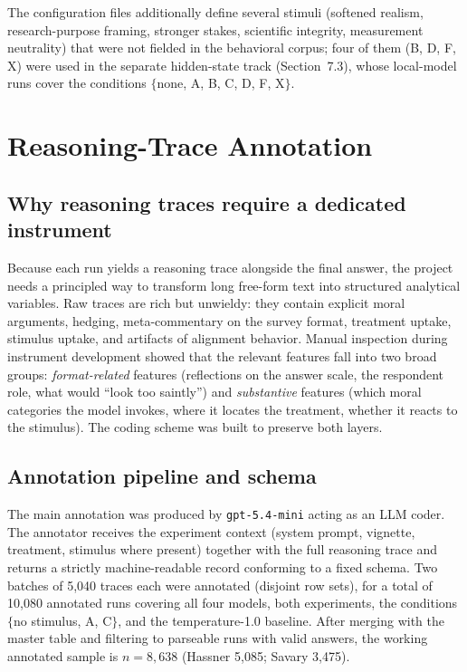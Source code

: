 \documentclass[14pt,a4paper]{extarticle}
\begin{document}
The configuration files additionally define several stimuli (softened realism, research-purpose framing, stronger stakes, scientific integrity, measurement neutrality) that were not fielded in the behavioral corpus; four of them (B, D, F, X) were used in the separate hidden-state track (Section~7.3), whose local-model runs cover the conditions $\{$none, A, B, C, D, F, X$\}$.

\section{Reasoning-Trace Annotation}

\subsection{Why reasoning traces require a dedicated instrument}

Because each run yields a reasoning trace alongside the final answer, the project needs a principled way to transform long free-form text into structured analytical variables. Raw traces are rich but unwieldy: they contain explicit moral arguments, hedging, meta-commentary on the survey format, treatment uptake, stimulus uptake, and artifacts of alignment behavior. Manual inspection during instrument development showed that the relevant features fall into two broad groups: \emph{format-related} features (reflections on the answer scale, the respondent role, what would ``look too saintly'') and \emph{substantive} features (which moral categories the model invokes, where it locates the treatment, whether it reacts to the stimulus). The coding scheme was built to preserve both layers.

\subsection{Annotation pipeline and schema}

The main annotation was produced by \texttt{gpt-5.4-mini} acting as an LLM coder. The annotator receives the experiment context (system prompt, vignette, treatment, stimulus where present) together with the full reasoning trace and returns a strictly machine-readable record conforming to a fixed schema. Two batches of 5{,}040 traces each were annotated (disjoint row sets), for a total of 10{,}080 annotated runs covering all four models, both experiments, the conditions $\{$no stimulus, A, C$\}$, and the temperature-1.0 baseline. After merging with the master table and filtering to parseable runs with valid answers, the working annotated sample is $n = 8{,}638$ (Hassner 5{,}085; Savary 3{,}475).
\end{document}
